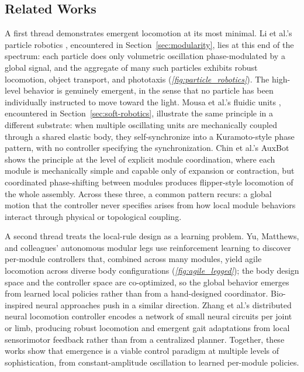 \subsection{Related Works}
\label{subsec:emergence-related}

A first thread demonstrates emergent locomotion at its most minimal. Li et al.'s particle robotics \cite{liParticleRoboticsBased2019}, encountered in Section~\ref{sec:modularity}, lies at this end of the spectrum: each particle does only volumetric oscillation phase-modulated by a global signal, and the aggregate of many such particles exhibits robust locomotion, object transport, and phototaxis (\textit{\cref{fig:particle_robotics}}). The high-level behavior is genuinely emergent, in the sense that no particle has been individually instructed to move toward the light. Mousa et al.'s fluidic units \cite{mousaMultifunctionalFluidicUnits}, encountered in Section~\ref{sec:soft-robotics}, illustrate the same principle in a different substrate: when multiple oscillating units are mechanically coupled through a shared elastic body, they self-synchronize into a Kuramoto-style phase pattern, with no controller specifying the synchronization. Chin et al.'s AuxBot \cite{chinFlipperStyleLocomotionStrong2023} shows the principle at the level of explicit module coordination, where each module is mechanically simple and capable only of expansion or contraction, but coordinated phase-shifting between modules produces flipper-style locomotion of the whole assembly. Across these three, a common pattern recurs: a global motion that the controller never specifies arises from how local module behaviors interact through physical or topological coupling.

A second thread treats the local-rule design as a learning problem. Yu, Matthews, and colleagues' autonomous modular legs \cite{AgileLeggedLocomotion} use reinforcement learning to discover per-module controllers that, combined across many modules, yield agile locomotion across diverse body configurations (\textit{\cref{fig:agile_legged}}); the body design space and the controller space are co-optimized, so the global behavior emerges from learned local policies rather than from a hand-designed coordinator. Bio-inspired neural approaches push in a similar direction. Zhang et al.'s distributed neural locomotion controller \cite{zhangBioInspiredDistributedNeural} encodes a network of small neural circuits per joint or limb, producing robust locomotion and emergent gait adaptations from local sensorimotor feedback rather than from a centralized planner. Together, these works show that emergence is a viable control paradigm at multiple levels of sophistication, from constant-amplitude oscillation to learned per-module policies.

